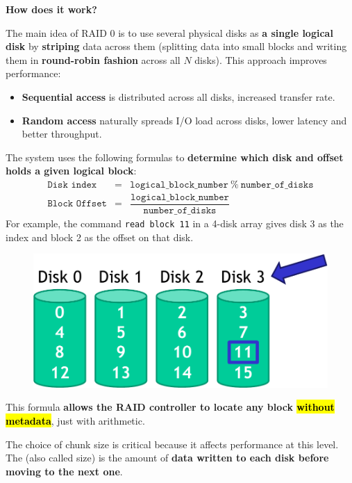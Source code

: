 \highspace
\begin{flushleft}
    \textcolor{Green3}{ \textbf{How does it work?}}
\end{flushleft}
The main idea of RAID 0 is to use several physical disks as \textbf{a single logical disk} by \textbf{striping} data across them (splitting data into small blocks and writing them in \textbf{round-robin fashion} across all $N$ disks). This approach improves performance:
\begin{itemize}
    \item \textbf{Sequential access} is distributed across all disks, increased transfer rate.
    \item \textbf{Random access} naturally spreads I/O load across disks, lower latency and better throughput.
\end{itemize}
The system uses the following formulas to \textbf{determine which disk and offset holds a given logical block}:
\begin{equation}
    \begin{array}{rcl}
        \texttt{Disk index}     &=& \texttt{logical\_block\_number} \: \% \: \texttt{number\_of\_disks} \\ [.5em]
        \texttt{Block Offset}   &=& \dfrac{\texttt{logical\_block\_number}}{\texttt{number\_of\_disks}}
    \end{array}
\end{equation}
For example, the command \texttt{read block 11} in a 4-disk array gives disk 3 as the index and block 2 as the offset on that disk.

\begin{figure}[!htp]
    \centering
    \includegraphics[width=.5\textwidth]{img/raid-1.pdf}
\end{figure}

\noindent
This formula \textbf{allows the RAID controller to locate any block \hl{without metadata}}, just with arithmetic.

\highspace
The choice of chunk size is critical because it affects performance at this level. The  (also called  size) is the amount of \textbf{data written to each disk before moving to the next one}.

